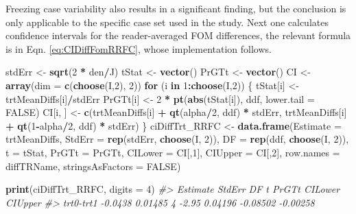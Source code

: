 \documentclass[
]{book}
\newenvironment{Shaded}{\begin{snugshade}}{\end{snugshade}}
\newcommand{\CommentTok}[1]{\textcolor[rgb]{0.56,0.35,0.01}{\textit{#1}}}
\newcommand{\ControlFlowTok}[1]{\textcolor[rgb]{0.13,0.29,0.53}{\textbf{#1}}}
\newcommand{\DataTypeTok}[1]{\textcolor[rgb]{0.13,0.29,0.53}{#1}}
\newcommand{\DecValTok}[1]{\textcolor[rgb]{0.00,0.00,0.81}{#1}}
\newcommand{\KeywordTok}[1]{\textcolor[rgb]{0.13,0.29,0.53}{\textbf{#1}}}
\newcommand{\NormalTok}[1]{#1}
\newcommand{\OperatorTok}[1]{\textcolor[rgb]{0.81,0.36,0.00}{\textbf{#1}}}
\newcommand{\OtherTok}[1]{\textcolor[rgb]{0.56,0.35,0.01}{#1}}
\newcommand{\StringTok}[1]{\textcolor[rgb]{0.31,0.60,0.02}{#1}}
\begin{document}
Freezing case variability also results in a significant finding, but the conclusion is only applicable to the specific case set used in the study. Next one calculates confidence intervals for the reader-averaged FOM differences, the relevant formula is in Eqn. \eqref{eq:CIDiffFomRRFC}, whose implementation follows.

\begin{Shaded}
\begin{Highlighting}[]
\NormalTok{stdErr \textless{}{-}}\StringTok{ }\KeywordTok{sqrt}\NormalTok{(}\DecValTok{2} \OperatorTok{*}\StringTok{ }\NormalTok{den}\OperatorTok{/}\NormalTok{J)}
\NormalTok{tStat \textless{}{-}}\StringTok{ }\KeywordTok{vector}\NormalTok{()}
\NormalTok{PrGTt \textless{}{-}}\StringTok{ }\KeywordTok{vector}\NormalTok{()}
\NormalTok{CI \textless{}{-}}\StringTok{ }\KeywordTok{array}\NormalTok{(}\DataTypeTok{dim =} \KeywordTok{c}\NormalTok{(}\KeywordTok{choose}\NormalTok{(I,}\DecValTok{2}\NormalTok{), }\DecValTok{2}\NormalTok{))}
\ControlFlowTok{for}\NormalTok{ (i }\ControlFlowTok{in} \DecValTok{1}\OperatorTok{:}\KeywordTok{choose}\NormalTok{(I,}\DecValTok{2}\NormalTok{)) \{}
\NormalTok{  tStat[i] \textless{}{-}}\StringTok{ }\NormalTok{trtMeanDiffs[i]}\OperatorTok{/}\NormalTok{stdErr}
\NormalTok{  PrGTt[i] \textless{}{-}}\StringTok{ }\DecValTok{2} \OperatorTok{*}\StringTok{ }
\StringTok{    }\KeywordTok{pt}\NormalTok{(}\KeywordTok{abs}\NormalTok{(tStat[i]), ddf, }\DataTypeTok{lower.tail =} \OtherTok{FALSE}\NormalTok{)}
\NormalTok{  CI[i, ] \textless{}{-}}\StringTok{ }\KeywordTok{c}\NormalTok{(trtMeanDiffs[i] }\OperatorTok{+}\StringTok{ }\KeywordTok{qt}\NormalTok{(alpha}\OperatorTok{/}\DecValTok{2}\NormalTok{, ddf) }\OperatorTok{*}\StringTok{ }\NormalTok{stdErr, }
\NormalTok{               trtMeanDiffs[i] }\OperatorTok{+}\StringTok{ }\KeywordTok{qt}\NormalTok{(}\DecValTok{1}\OperatorTok{{-}}\NormalTok{alpha}\OperatorTok{/}\DecValTok{2}\NormalTok{, ddf) }\OperatorTok{*}\StringTok{ }\NormalTok{stdErr)}
\NormalTok{\}}
\NormalTok{ciDiffTrt\_RRFC \textless{}{-}}\StringTok{ }
\StringTok{  }\KeywordTok{data.frame}\NormalTok{(}\DataTypeTok{Estimate =}\NormalTok{ trtMeanDiffs, }
             \DataTypeTok{StdErr =} \KeywordTok{rep}\NormalTok{(stdErr, }\KeywordTok{choose}\NormalTok{(I, }\DecValTok{2}\NormalTok{)), }
             \DataTypeTok{DF =} \KeywordTok{rep}\NormalTok{(ddf, }\KeywordTok{choose}\NormalTok{(I, }\DecValTok{2}\NormalTok{)), }
             \DataTypeTok{t =}\NormalTok{ tStat, }
             \DataTypeTok{PrGTt =}\NormalTok{ PrGTt, }
             \DataTypeTok{CILower =}\NormalTok{ CI[,}\DecValTok{1}\NormalTok{],}
             \DataTypeTok{CIUpper =}\NormalTok{ CI[,}\DecValTok{2}\NormalTok{],}
             \DataTypeTok{row.names =}\NormalTok{ diffTRName, }
             \DataTypeTok{stringsAsFactors =} \OtherTok{FALSE}\NormalTok{)}

\KeywordTok{print}\NormalTok{(ciDiffTrt\_RRFC, }\DataTypeTok{digits =} \DecValTok{4}\NormalTok{)}
\CommentTok{\#\textgreater{}           Estimate  StdErr DF     t   PrGTt  CILower  CIUpper}
\CommentTok{\#\textgreater{} trt0{-}trt1  {-}0.0438 0.01485  4 {-}2.95 0.04196 {-}0.08502 {-}0.00258}
\end{Highlighting}
\end{Shaded}
\end{document}
